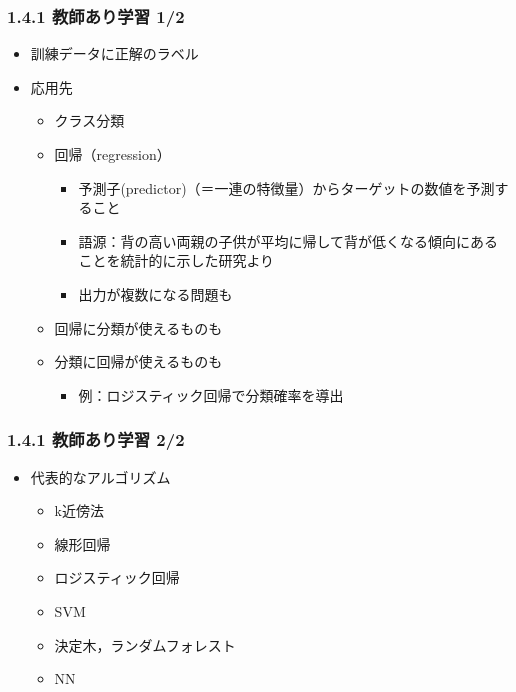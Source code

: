 \documentclass[aspectratio=169, dvipdfmx, 14pt, xcolor={svgnames,dvipsnames}]{beamer}
\def\tightlist{\itemsep1pt\parskip0pt\parsep0pt}
\begin{document}
\begin{frame}
  \frametitle{1.4.1 教師あり学習 1/2}
  \begin{itemize}
    \tightlist
    \item
          訓練データに正解のラベル
    \item
          応用先

          \begin{itemize}
            \tightlist
            \item
                  クラス分類
            \item
                  回帰（regression）

                  \begin{itemize}
                    \tightlist
                    \item
                          予測子(predictor)（＝一連の特徴量）からターゲットの数値を予測すること
                    \item
                          語源：背の高い両親の子供が平均に帰して背が低くなる傾向にあることを統計的に示した研究より
                    \item
                          出力が複数になる問題も
                  \end{itemize}
            \item
                  回帰に分類が使えるものも
            \item
                  分類に回帰が使えるものも

                  \begin{itemize}
                    \tightlist
                    \item
                          例：ロジスティック回帰で分類確率を導出
                  \end{itemize}
          \end{itemize}
  \end{itemize}
\end{frame}


\begin{frame}
  \frametitle{1.4.1 教師あり学習 2/2}
  \begin{itemize}
    \item
          代表的なアルゴリズム

          \begin{itemize}
            \tightlist
            \item
                  k近傍法
            \item
                  線形回帰
            \item
                  ロジスティック回帰
            \item
                  SVM
            \item
                  決定木，ランダムフォレスト
            \item
                  NN
          \end{itemize}
  \end{itemize}
\end{frame}
\end{document}
